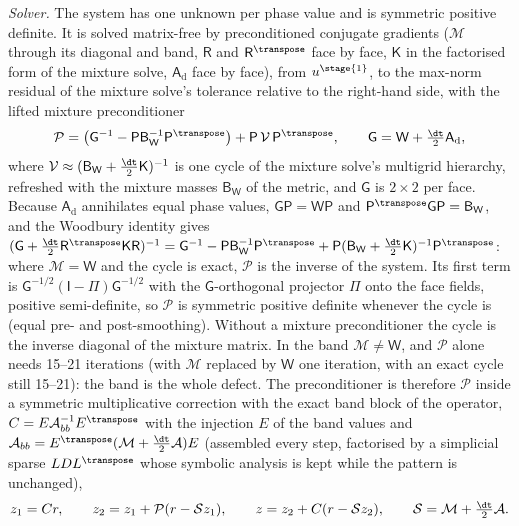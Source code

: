 \emph{Solver.} The system has one unknown per phase value and is symmetric
positive definite. It is solved matrix-free by preconditioned conjugate
gradients ($\mathcal M$ through its diagonal and band, $\mathsf R$ and
$\mathsf R^{\transpose}$ face by face, $\mathsf K$ in the factorised form of
the mixture solve, $\mathsf A_{\mathrm d}$ face by face), from
$u^{\stage{1}}$, to the max-norm residual of the mixture solve's tolerance
relative to the right-hand side, with the lifted mixture preconditioner
\[
  \mathcal P=\bigl(\mathsf G^{-1}-\mathsf P\mathsf B_{\mathsf W}^{-1}\mathsf P^{\transpose}\bigr)
  +\mathsf P\,\mathcal V\,\mathsf P^{\transpose},
  \qquad \mathsf G=\mathsf W+\tfrac{\dt}2\mathsf A_{\mathrm d},
\]
where $\mathcal V\approx(\mathsf B_{\mathsf W}+\tfrac{\dt}2\mathsf K)^{-1}$ is
one cycle of the mixture solve's multigrid hierarchy, refreshed with the
mixture masses $\mathsf B_{\mathsf W}$ of the metric, and $\mathsf G$ is
$2\times2$ per face. Because $\mathsf A_{\mathrm d}$ annihilates equal phase
values, $\mathsf G\mathsf P=\mathsf W\mathsf P$ and
$\mathsf P^{\transpose}\mathsf G\mathsf P=\mathsf B_{\mathsf W}$, and the
Woodbury identity gives
$(\mathsf G+\tfrac{\dt}2\mathsf R^{\transpose}\mathsf K\mathsf R)^{-1}
=\mathsf G^{-1}-\mathsf P\mathsf B_{\mathsf W}^{-1}\mathsf P^{\transpose}
+\mathsf P(\mathsf B_{\mathsf W}+\tfrac{\dt}2\mathsf K)^{-1}\mathsf P^{\transpose}$:
where $\mathcal M=\mathsf W$ and the cycle is exact, $\mathcal P$ is the
inverse of the system. Its first term is
$\mathsf G^{-1/2}(\mathsf I-\Pi)\mathsf G^{-1/2}$ with the
$\mathsf G$-orthogonal projector $\Pi$ onto the face fields, positive
semi-definite, so $\mathcal P$ is symmetric positive definite whenever the
cycle is (equal pre- and post-smoothing). Without a mixture preconditioner
the cycle is the inverse diagonal of the mixture matrix. In the band
$\mathcal M\ne\mathsf W$, and $\mathcal P$ alone needs 15--21 iterations (with
$\mathcal M$ replaced by $\mathsf W$ one iteration, with an exact cycle still
15--21): the band is the whole defect. The preconditioner is therefore $\mathcal P$
inside a symmetric multiplicative correction with the exact band block of the
operator, $C=E\mathcal A_{bb}^{-1}E^{\transpose}$ with the injection $E$ of the
band values and
$\mathcal A_{bb}=E^{\transpose}(\mathcal M+\tfrac{\dt}2\mathcal A)E$ (assembled
every step, factorised by a simplicial sparse $LDL^{\transpose}$ whose symbolic
analysis is kept while the pattern is unchanged),
\[
  z_1=Cr,\qquad z_2=z_1+\mathcal P(r-\mathcal Sz_1),\qquad
  z=z_2+C(r-\mathcal Sz_2),\qquad \mathcal S=\mathcal M+\tfrac{\dt}2\mathcal A .
\]

